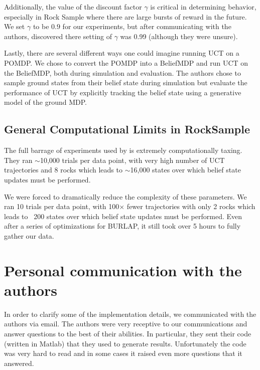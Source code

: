 \documentclass[11pt,twocolumn]{article}
\begin{document}
Additionally, the value of the discount factor $\gamma$ is critical in determining behavior, especially in Rock Sample where there are large bursts of reward in the future. We set $\gamma$ to be $0.9$ for our experiments, but after communicating with the authors, discovered there setting of $\gamma$ was 0.99 (although they were unsure). 

Lastly, there are several different ways one could imagine running UCT on a POMDP. We chose to convert the POMDP into a BeliefMDP and run UCT on the BeliefMDP, both during simulation and evaluation. The authors chose to sample ground states from their belief state during simulation but evaluate the performance of UCT by explicitly tracking the belief state using a generative model of the ground MDP.

\subsection{General Computational Limits in RockSample}
\label{sec: compLim}
The full barrage of experiments used by \cite{jiang2015dependence} is extremely computationally taxing. They ran $\sim$10,000 trials per data point, with very high number of UCT trajectories and 8 rocks which leads to $\sim$16,000 states over which belief state updates must be performed. 

We were forced to dramatically reduce the complexity of these parameters. We ran 10 trials per data point, with 100$\times$ fewer trajectories with only 2 rocks which leads to ~200 states over which belief state updates must be performed. Even after a series of optimizations for BURLAP, it still took over 5 hours to fully gather our data.


\section{Personal communication with the authors}
In order to clarify some of the implementation details, we communicated with the authors via email. 
The authors were very receptive to our communications and answer questions to the best of their abilities. In particular, they sent their code (written in Matlab) that they used
to generate results. Unfortunately the code was very hard to read and in some cases it raised even more questions that it answered. 



\end{document}
